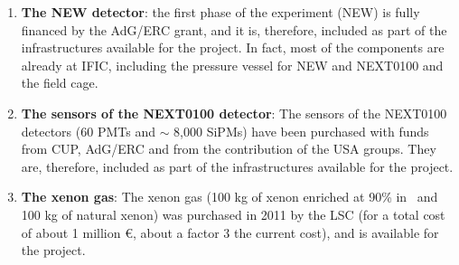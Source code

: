 \begin{enumerate}
\item {\bf The NEW detector}: the first phase of the experiment (NEW) is fully financed by the AdG/ERC grant, and it is, therefore, included as part of the infrastructures available for the project. In fact, most of the components are already at IFIC, including the pressure vessel for NEW and NEXT0100 and the field cage. 
\item {\bf The sensors of the NEXT0100 detector}: The sensors of the NEXT0100 detectors (60 PMTs and $\sim$ 8,000 SiPMs) have been purchased with funds from CUP, AdG/ERC and from the contribution of the USA groups. They are, therefore, included as part of the infrastructures available for the project. 
\item {\bf The xenon gas}: The xenon gas (100 kg of xenon enriched at 90\% in \XE\ and 100 kg of natural xenon) was purchased in 2011 by the LSC (for a total cost of about 1 million \euro, about a factor 3 the current cost), and is available for the project. 
\end{enumerate}
